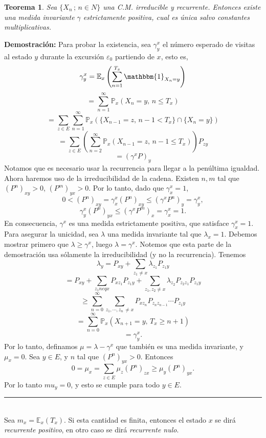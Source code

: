 \documentclass[a4paper]{article}
\newcommand{\prob}{\mathbb{P}}
\newtheorem{teorema}{Teorema}
\numberwithin{equation}{subsection}
\def\E{\mathbb E}
\begin{document}
\begin{teorema}
Sea $\{X_n\,;\,n\in N\}$ una C.M. irreducible y recurrente. Entonces existe una medida invariante $\gamma$ estrictamente positiva, cual es única salvo constantes multiplicativas.
\end{teorema}

\textbf{Demostración: }Para probar la existencia, sea $\gamma_y^x$ el número esperado de visitas al estado $y$ durante la excursión $\varepsilon_0$ partiendo de $x$, esto es,
\[\gamma_y^x = \E_x\left(\sum_{n=1}^{T_x}\mathbbm{1}_{X_n=y}\right)\]
\[= \sum_{n=1}^{\infty}\prob_x \left(X_n = y,\, n\leq T_x\right)\]
\[=\sum_{z\in E}\sum_{n=1}^{\infty}\prob_x(\{X_{n-1}=z,\,n-1<T_x\}\cap\{X_n = y\})\]
\[=\sum_{z\in E}\left(\sum_{n=2}^{\infty}\prob_x(X_{n-1} = z,\,n-1\leq T_x)\right)P_{zy}\]
\[= (\gamma^x P)_y\]
Notamos que es necesario usar la recurrencia para llegar a la penúltima igualdad. Ahora haremos uso de la irreducibilidad de la cadena. Existen $n,m$ tal que $(P^n)_{xy}>0$, $(P^m)_{yx}>0$. Por lo tanto, dado que $\gamma_x^x = 1$,
\[0<(P^n)_{xy} = \gamma_x^x (P^n)_{xy}\leq (\gamma^x P^n)_y = \gamma_y^x,\]
\[\gamma_y^x(P^n)_{yx}\leq (\gamma^x P^m)_x = \gamma_x^x = 1.\]
En consecuencia, $\gamma^x$ es una medida estrictamente positiva, que satisface $\gamma_x^x =1$.\\ Para asegurar la unicidad, sea $\lambda$ una medida invariante tal que $\lambda_x = 1$. Debemos mostrar primero que $\lambda \geq \gamma^x$, luego $\lambda = \gamma^x$. Notemos que esta parte de la demostración usa sólamente la irreducibilidad (y no la recurrencia). Tenemos
\[\lambda_y = P_{xy} + \sum_{z_1 \neq x}\lambda_{z_1}P_{z_1 y}\]
\[= P_{xy} + \sum_{z_1neq x}P_{xz_1}P_{z_1y} + \sum_{z_1,z_2 \neq x}\lambda_{z_2}P_{z_2z_1}P_{z_1y}\]
\[\geq \sum_{n=0}^{\infty}\sum_{z_1,\cdots,z_n\,\neq x}P_{xz_n}P_{z_nz_{n-1}}\cdots P_{z_1y}\]
\[= \sum_{n=0}^{\infty}\prob_x\left(X_{n+1} =y,\, T_x \geq n+1\right)\]
\[= \gamma_y^x.\]
Por lo tanto, definamos $\mu = \lambda -\gamma^x$ que también es una medida invariante, y $\mu_x =0$. Sea $y\in E$, y $n$ tal que $(P^n)_{yx}>0$. Entonces
\[0 = \mu_x = \sum_{z \in E}\mu_z(P^n)_{zx} \geq \mu_y(P^n)_{yx}.\]
Por lo tanto $mu_y = 0$, y esto se cumple para todo $y \in E$.\\
\rule{0.7em}{0.7em}\\ \newline
Sea $m_x = \E_x(T_x)$. Si esta cantidad es finita, entonces el estado $x$ se dirá \textit{recurrente positivo}, en otro caso se dirá \textit{recurrente nulo}.
\end{document}
